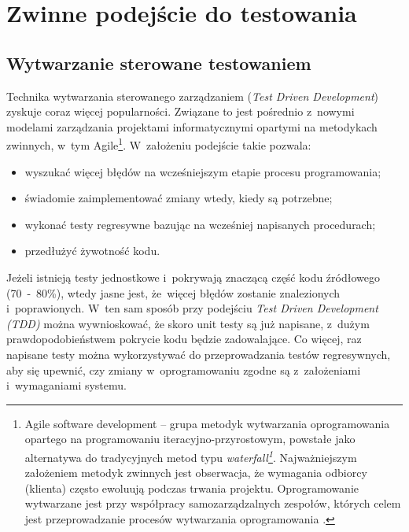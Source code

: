\section{Zwinne podejście do testowania}
\label{zwinne_testowanie}
\subsection{Wytwarzanie sterowane testowaniem}
\label{test_driven_development}
Technika wytwarzania sterowanego zarządzaniem (\textit{Test Driven Development}) zyskuje coraz więcej popularności. Związane to jest pośrednio z~nowymi modelami zarządzania projektami informatycznymi opartymi na metodykach zwinnych, w~tym Agile\footnote{Agile software development – grupa metodyk wytwarzania oprogramowania opartego na programowaniu iteracyjno-przyrostowym, powstałe jako alternatywa do tradycyjnych metod typu \textit{waterfall\footnote{Iteracyjny model kaskadowy (ang. waterfall model) – jeden z~kilku rodzajów procesów tworzenia oprogramowania zdefiniowany w~inżynierii oprogramowania. Polega on na wykonywaniu podstawowych czynności jako odrębnych faz projektowych, w~porządku jeden po drugim. Każda czynność to kolejny schodek (kaskada). Jeśli któraś z~faz zwróci niesatysfakcjonujący produkt, należy się cofnąć wykonując kolejne iteracje aż do momentu kiedy otrzymano satysfakcjonujący produkt na końcu schodków \cite{website:wikipedia}.}}. Najważniejszym założeniem metodyk zwinnych jest obserwacja, że wymagania odbiorcy (klienta) często ewoluują podczas trwania projektu. Oprogramowanie wytwarzane jest przy współpracy samozarządzalnych zespołów, których celem jest przeprowadzanie procesów wytwarzania oprogramowania \cite{website:wikipedia}.}. W~założeniu podejście takie pozwala:

\begin{itemize}
\item wyszukać więcej błędów na wcześniejszym etapie procesu programowania;
\item świadomie zaimplementować zmiany wtedy, kiedy są potrzebne;
\item wykonać testy regresywne bazując na wcześniej napisanych procedurach;
\item przedłużyć żywotność kodu.
\end{itemize}

Jeżeli istnieją testy jednostkowe i~pokrywają znaczącą część kodu źródłowego (70~-~80\%), wtedy jasne jest, że~więcej błędów zostanie znalezionych i~poprawionych. W~ten sam sposób przy podejściu \textit{Test Driven Development (TDD)} można wywnioskować, że skoro unit testy są już napisane, z~dużym prawdopodobieństwem pokrycie kodu będzie zadowalające. Co więcej, raz napisane testy można wykorzystywać do przeprowadzania testów regresywnych, aby się upewnić, czy zmiany w~oprogramowaniu zgodne są z~założeniami i~wymaganiami systemu.

